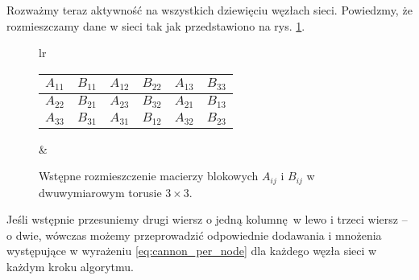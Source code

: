 Rozważmy teraz aktywność na wszystkich dziewięciu węzłach sieci. Powiedzmy, że rozmieszczamy dane w sieci tak jak przedstawiono na rys. \ref{fig:cannon_init_2}.

\begin{figure}[H]
\centering
\begin{tabular}{lr}
\begin{tabular}{|cc|cc|cc|}
\hline
\(A_{11}\) & \(B_{11}\) & \(A_{12}\) & \(B_{22}\) & \(A_{13}\) & \(B_{33}\) \\
\hline
\(A_{22}\) & \(B_{21}\) & \(A_{23}\) & \(B_{32}\) & \(A_{21}\) & \(B_{13}\) \\
\hline
\(A_{33}\) & \(B_{31}\) & \(A_{31}\) & \(B_{12}\) & \(A_{32}\) & \(B_{23} \) \\
\hline
\end{tabular} &
\hspace{1cm}
\end{tabular}
\caption{Wstępne rozmieszczenie macierzy blokowych \(A_{ij}\) i \(B_{ij}\) w dwuwymiarowym torusie \(3\times 3\).}
\label{fig:cannon_init_2}
\end{figure}

\noindent Jeśli wstępnie przesuniemy drugi wiersz o jedną kolumnę w lewo i trzeci wiersz -- o dwie, wówczas możemy przeprowadzić odpowiednie dodawania i mnożenia występujące w wyrażeniu \eqref{eq:cannon_per_node} dla każdego węzła sieci w każdym kroku algorytmu. 

